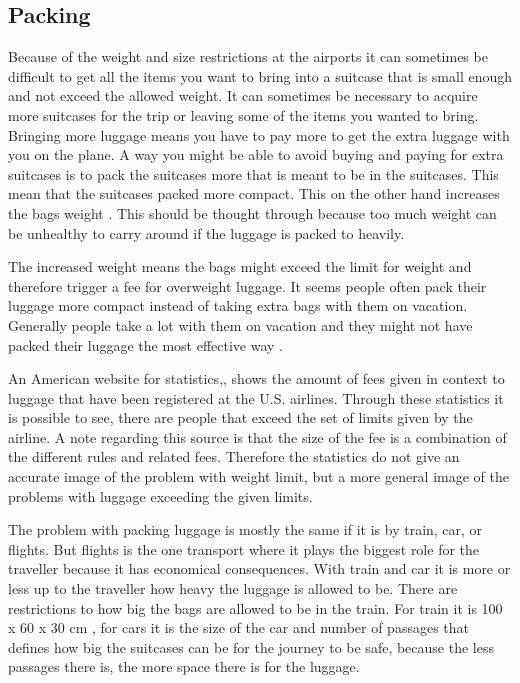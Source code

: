 \subsection*{Packing}

Because of the weight and size restrictions at the airports it can sometimes be difficult to get all the items you want to bring into a suitcase that is small enough and not exceed the allowed weight. It can sometimes be necessary to acquire more suitcases for the trip or leaving some of the items you wanted to bring. 
Bringing more luggage means you have to pay more to get the extra luggage with you on the plane. A way you might be able to avoid buying and paying for extra suitcases is to pack the suitcases more that is meant to be in the suitcases. This mean that the suitcases packed more compact. This on the other hand increases the bags weight \citep{altombag}. This should be thought through because too much weight can be unhealthy to carry around if the luggage is packed to heavily.

The increased weight means the bags might exceed the limit for weight and therefore trigger a fee for overweight luggage.
It seems people often pack their luggage more compact instead of taking extra bags with them on vacation. Generally people take a lot with them on vacation and they might not have packed their luggage the most effective way \citep{airstat}.

An American website for statistics,\citep{airstat}, shows the amount of fees given in context to luggage that have been registered at the U.S. airlines. Through these statistics it is possible to see, there are people that exceed the set of limits given by the airline. A note regarding this source is that the size of the fee is a combination of the different rules and related fees. Therefore the statistics do not give an accurate image of the problem with weight limit, but a more general image of the problems with luggage exceeding the given limits.

The problem with packing luggage is mostly the same if it is by train, car, or flights. But flights is the one transport where it plays the biggest role for the traveller because it has economical consequences. With train and car it is more or less up to the traveller how heavy the luggage is allowed to be. There are restrictions to how big the bags are allowed to be in the train. For train it is 100 x 60 x 30 cm \citep{rulestrain}, for cars it is the size of the car and number of passages that defines how big the suitcases can be for the journey to be safe, because the less passages there is, the more space there is for the luggage.

